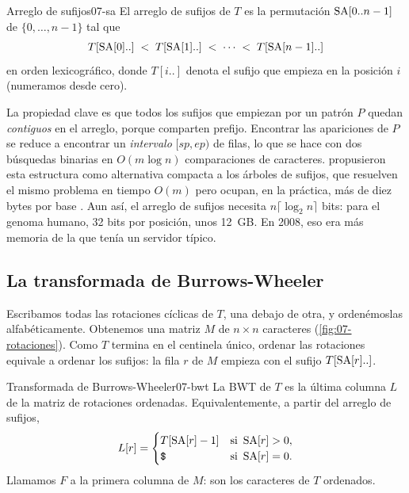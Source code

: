 \begin{definicion}{Arreglo de sufijos}{07-sa}
El arreglo de sufijos de $T$ es la permutación $\operatorname{SA}[0..n-1]$ de $\{0,\dots,n-1\}$ tal que
\begin{equation}\label{eq:07-sa}
T[\operatorname{SA}[0]..] \;<\; T[\operatorname{SA}[1]..] \;<\;\cdots\;<\; T[\operatorname{SA}[n-1]..]
\end{equation}
en orden lexicográfico, donde $T[i..]$ denota el sufijo que empieza en la posición $i$ (numeramos desde cero).
\end{definicion}

\begin{simbolos}
\end{simbolos}

La propiedad clave es que todos los sufijos que empiezan por un patrón $P$ quedan \emph{contiguos} en el arreglo, porque comparten prefijo. Encontrar las apariciones de $P$ se reduce a encontrar un \emph{intervalo} $[sp, ep)$ de filas, lo que se hace con dos búsquedas binarias en $O(m\log n)$ comparaciones de caracteres. \textcite{c07-manber1993} propusieron esta estructura como alternativa compacta a los árboles de sufijos, que resuelven el mismo problema en tiempo $O(m)$ pero ocupan, en la práctica, más de diez bytes por base \parencite{c07-gusfield1997}. Aun así, el arreglo de sufijos necesita $n\lceil\log_2 n\rceil$ bits: para el genoma humano, 32 bits por posición, unos 12~GB. En 2008, eso era más memoria de la que tenía un servidor típico.

\subsection{La transformada de Burrows-Wheeler}

Escribamos todas las rotaciones cíclicas de $T$, una debajo de otra, y ordenémoslas alfabéticamente. Obtenemos una matriz $M$ de $n\times n$ caracteres (\cref{fig:07-rotaciones}). Como $T$ termina en el centinela único, ordenar las rotaciones equivale a ordenar los sufijos: la fila $r$ de $M$ empieza con el sufijo $T[\operatorname{SA}[r]..]$.

\begin{definicion}{Transformada de Burrows-Wheeler}{07-bwt}
La BWT de $T$ es la última columna $L$ de la matriz de rotaciones ordenadas. Equivalentemente, a partir del arreglo de sufijos,
\begin{equation}\label{eq:07-bwt}
L[r] = \begin{cases}
T[\operatorname{SA}[r]-1] & \text{si } \operatorname{SA}[r]>0,\\
\texttt{\$} & \text{si } \operatorname{SA}[r]=0.
\end{cases}
\end{equation}
Llamamos $F$ a la primera columna de $M$: son los caracteres de $T$ ordenados.
\end{definicion}

